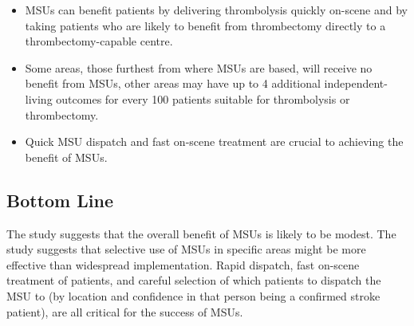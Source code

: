\begin{itemize}
    \item MSUs can benefit patients by delivering thrombolysis quickly on-scene and by taking patients who are likely to benefit from thrombectomy directly to a thrombectomy-capable centre.
    \item Some areas, those furthest from where MSUs are based, will receive no benefit from MSUs, other areas may have up to 4 additional independent-living outcomes for every 100 patients suitable for thrombolysis or thrombectomy.
    \item Quick MSU dispatch and fast on-scene treatment are crucial to achieving the benefit of MSUs. 
\end{itemize}

\subsection*{Bottom Line}

The study suggests that the overall benefit of MSUs is likely to be modest. The study suggests that selective use of MSUs in specific areas might be more effective than widespread implementation. Rapid dispatch, fast on-scene treatment of patients, and careful selection of which patients to dispatch the MSU to (by location and confidence in that person being a confirmed stroke patient), are all critical for the success of MSUs.